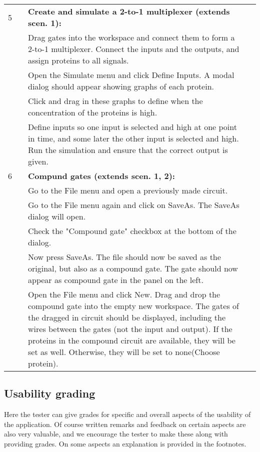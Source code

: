 \documentclass{article}
\newcounter{step}
\newcommand{\step}{\arabic{step}\stepcounter{step}}
\begin{document}
\begin{center}
\begin{longtable}{r r  p{} l }
5 &\setcounter{step}{1}& \textbf{Create and simulate a 2-to-1 multiplexer (extends scen. 1):}\\
&\step& Drag gates into the workspace and connect them to form a 2-to-1 multiplexer. Connect the inputs and the outputs, and assign proteins to all signals.\\
&\step& Open the Simulate menu and click Define Inputs. A modal dialog should appear showing graphs of each protein.\\
&\step& Click and drag in these graphs to define when the concentration of the proteins is high.\\
&\step& Define inputs so one input is selected and high at one point in time, and some later the other input is selected and high. Run the simulation and ensure that the correct output is given. \\ \midrule

6 &\setcounter{step}{1}& \textbf{Compund gates (extends scen. 1, 2):}\\
&\step& Go to the File menu and open a previously made circuit.  \\
&\step& Go to the File menu again and click on SaveAs. The SaveAs dialog will open.\\ 
&\step& Check the "Compound gate" checkbox at the bottom of the dialog. \\ 
&\step& Now press SaveAs. The file should now be saved as the original, but also as a compound gate. The gate should now appear as compound gate in the panel on the left.\\
&\step& Open the File menu and click New. Drag and drop the compound gate into the empty new workspace. The gates of the dragged in circuit should be displayed, including the wires between the gates (not the input and output). If the proteins in the compound circuit are available, they will be set as well. Otherwise, they will be set to none(Choose protein). \\

\end{longtable}
\end{center}

\newpage
\subsection{Usability grading}
Here the tester can give grades for specific and overall aspects of the usability of the application. Of course written remarks and feedback on certain aspects are also very valuable, and we encourage the tester to make these along with providing grades. On some aspects an explanation is provided in the footnotes.
\end{document}
